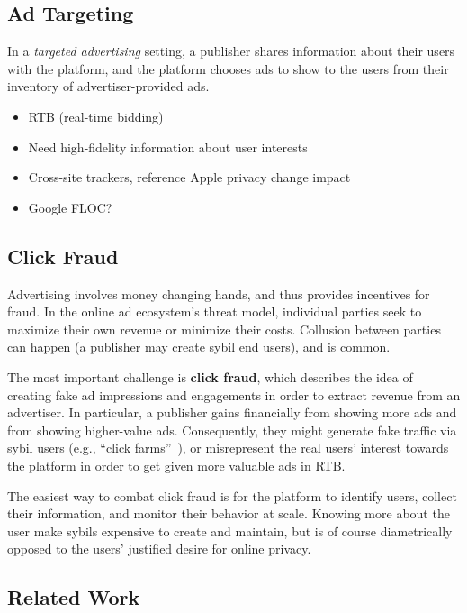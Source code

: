 \subsection{Ad Targeting}

%
In a \emph{targeted advertising} setting, a publisher shares information about
their users with the platform, and the platform chooses ads to show to the
users from their inventory of advertiser-provided ads.
%

\begin{itemize}
  \item RTB (real-time bidding)
  \item Need high-fidelity information about user interests
  \item Cross-site trackers, reference Apple privacy change impact
  \item Google FLOC?
\end{itemize}

\subsection{Click Fraud}

%
Advertising involves money changing hands, and thus provides incentives for
fraud.
%
In the online ad ecosystem's threat model, individual parties seek to maximize
their own revenue or minimize their costs.
%
Collusion between parties can happen (\eg a publisher may create sybil end
users), and is common.
%

%
The most important challenge is \textbf{click fraud}, which describes the idea
of creating fake ad impressions and engagements in order to extract revenue from
an advertiser.
%
In particular, a publisher gains financially from showing more ads and from
showing higher-value ads.
%
Consequently, they might generate fake traffic via sybil users (e.g., ``click
farms''~\cite{understanding-ad-fraud}), or misrepresent the real users' interest
towards the platform in order to get given more valuable ads in RTB.
%
%

%
The easiest way to combat click fraud is for the platform to identify users,
collect their information, and monitor their behavior at scale.
%
Knowing more about the user make sybils expensive to create and maintain, but is
of course diametrically opposed to the users' justified desire for online
privacy.
%

\subsection{Related Work}
\label{s:bg-related}

